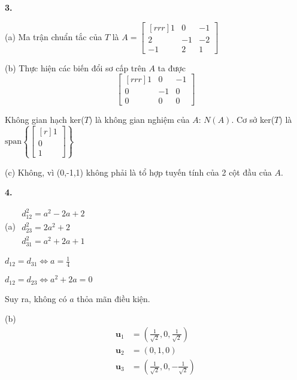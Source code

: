 \documentclass{article}
\newcommand\ddfrac[2]{\frac{\displaystyle #1}{\displaystyle #2}}
\begin{document}
    \begin{minipage}[t]{0.44\linewidth}
    \textbf{3.}

    (a) Ma trận chuẩn tắc của $T$ là $A = \begin{bmatrix}[rrr]
        1 & 0 & -1 \\
        2 & -1 & -2 \\
        -1 & 2 & 1 
    \end{bmatrix} $

    (b) Thực hiện các biến đổi sơ cấp trên $A$ ta được
    \[ \begin{bmatrix}[rrr]
        1 & 0 & -1 \\
        0 & -1 & 0 \\
        0 & 0 & 0 
    \end{bmatrix} \]

    Không gian hạch ker($T$) là không gian nghiệm của $A$:  $N(A)$.
    Cơ sở ker($T$) là $\text{span} \left\{ \begin{bmatrix}[r]
        1 \\
        0 \\
        1 
    \end{bmatrix}  \right\}$

    (c) Không, vì  (0,-1,1) không phải là tổ hợp tuyến tính của 2 cột đầu của $A$.

        
    \end{minipage} \hfill
    \begin{minipage}[t]{0.5\linewidth}
    \textbf{4.}

    (a)
    $ \begin{array}{l}
        d_{12}^2 = a^2 - 2a + 2 \\
        d_{23}^2 = 2a^2 + 2 \\
        d_{31}^2 = a^2 + 2a + 1
    \end{array}$

    $ d_{12} = d_{31} \Leftrightarrow a = \ddfrac{1}{4} $ 

    $ d_{12} = d_{23} \Leftrightarrow a^2 + 2a = 0 $

    Suy ra, không có $a$ thỏa mãn điều kiện.

    (b)  
   \begin{equation*}
        \begin{split}
            \textbf{u}_1 &= \left( \ddfrac{1}{\sqrt{2}} , 0, \ddfrac{1}{\sqrt{2}}  \right) \\
            \textbf{u}_2 &= (0, 1, 0) \\
            \textbf{u}_3 &= \left( \ddfrac{1}{\sqrt{2}} , 0,  - \ddfrac{1}{\sqrt{2}}  \right)
        \end{split}
    \end{equation*} 

        
    \end{minipage}
\end{document}
